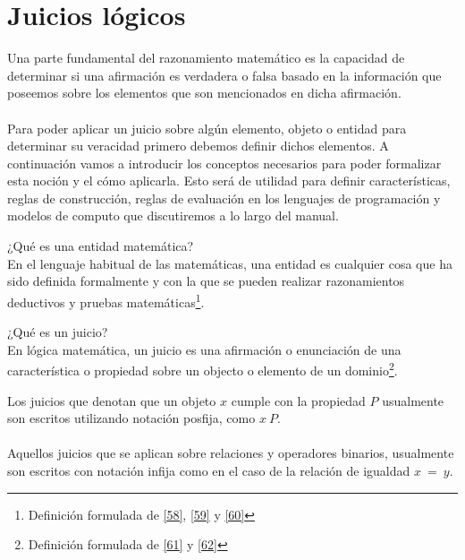 \section{Juicios lógicos}

    Una parte fundamental del razonamiento matemático es la capacidad de determinar si una afirmación es verdadera o falsa basado en la información que poseemos sobre los elementos que son mencionados en dicha afirmación. \\\\
    Para poder aplicar un juicio sobre algún elemento, objeto o entidad para determinar su veracidad primero debemos definir dichos elementos. A continuación vamos a introducir los conceptos necesarios para poder formalizar esta noción y el cómo aplicarla. Esto será de utilidad para definir características, reglas de construcción, reglas de evaluación en los lenguajes de programación y modelos de computo que discutiremos a lo largo del manual.\\

    \bigskip

    \begin{definition}
	¿Qué es una entidad matemática? \\ 
	  En el lenguaje habitual de las matemáticas, una entidad es cualquier cosa que ha sido definida formalmente y con la que se pueden realizar razonamientos deductivos y pruebas matemáticas\footnote{Definición formulada de \hyperlink{58}{[58]}, \hyperlink{59}{[59]} y \hyperlink{60}{[60]}}.
    \end{definition}

\bigskip

    \begin{definition}
	¿Qué es un juicio? \\
         En lógica matemática, un juicio es una afirmación o enunciación de una característica o propiedad sobre un objecto o elemento de un dominio\footnote{Definición formulada de \hyperlink{61}{[61]} y \hyperlink{62}{[62]}}.
    \end{definition} 

\bigskip

Los juicios que denotan que un objeto $x$ cumple con la propiedad $P$ usualmente son escritos utilizando notación posfija, como $x\ P$.\\\\
Aquellos juicios que se aplican sobre relaciones y operadores binarios, usualmente son escritos con notación infija como en el caso de la relación de igualdad  $x\ =\ y$.

